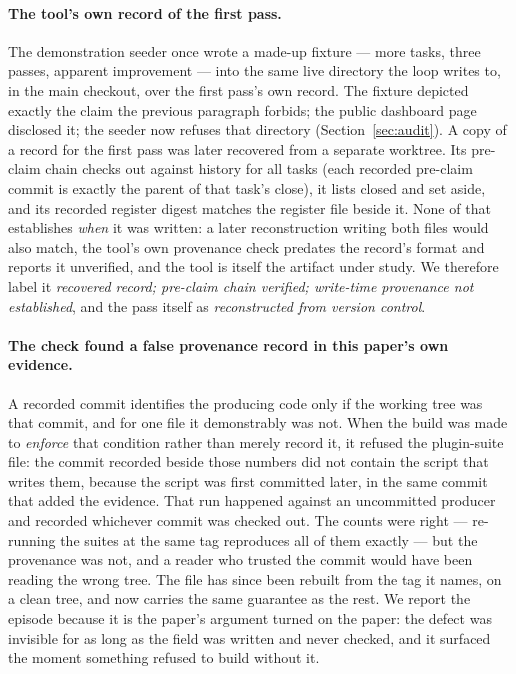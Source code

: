 \documentclass[10pt]{article}
\begin{document}
\paragraph{The tool's own record of the first pass.} The demonstration seeder once wrote a made-up fixture --- more tasks, three passes, apparent improvement --- into the same live directory the loop writes to, in the main checkout, over the first pass's own record. The fixture depicted exactly the claim the previous paragraph forbids; the public dashboard page disclosed it; the seeder now refuses that directory (Section~\ref{sec:audit}). A copy of a record for the first pass was later recovered from a separate worktree. Its pre-claim chain checks out against history for all \claimchain{} tasks (each recorded pre-claim commit is exactly the parent of that task's close), it lists \claimclosed{} closed and \claimparked{} set aside, and its recorded register digest matches the register file beside it. None of that establishes \emph{when} it was written: a later reconstruction writing both files would also match, the tool's own provenance check predates the record's format and reports it unverified, and the tool is itself the artifact under study. We therefore label it \emph{recovered record; pre-claim chain verified; write-time provenance not established}, and the pass itself as \emph{reconstructed from version control}.

\paragraph{The check found a false provenance record in this paper's own evidence.} A recorded commit identifies the producing code only if the working tree was that commit, and for one file it demonstrably was not. When the build was made to \emph{enforce} that condition rather than merely record it, it refused the plugin-suite file: the commit recorded beside those numbers did not contain the script that writes them, because the script was first committed later, in the same commit that added the evidence. That run happened against an uncommitted producer and recorded whichever commit was checked out. The counts were right --- re-running the suites at the same tag reproduces all of them exactly --- but the provenance was not, and a reader who trusted the commit would have been reading the wrong tree. The file has since been rebuilt from the tag it names, on a clean tree, and now carries the same guarantee as the rest. We report the episode because it is the paper's argument turned on the paper: the defect was invisible for as long as the field was written and never checked, and it surfaced the moment something refused to build without it.
\end{document}
